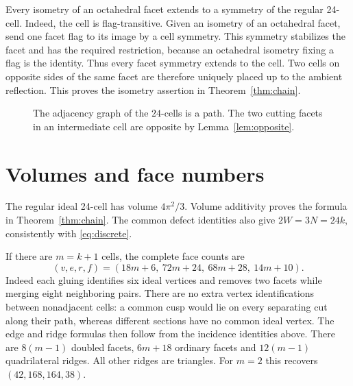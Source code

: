 \documentclass[11pt]{article}
\theoremstyle{remark}
\newcommand{\CELL}{\mathcal C}
\begin{document}
Every isometry of an octahedral facet extends to a symmetry of
the regular 24-cell. Indeed, the cell is flag-transitive. Given an isometry of an
octahedral facet, send one facet flag to its image by a cell
symmetry. This symmetry stabilizes the facet and has the required
restriction, because an octahedral isometry fixing a flag is the
identity. Thus every facet symmetry extends to the cell.
Two cells on opposite sides of the same facet are therefore
uniquely placed up to the ambient reflection. This proves the
isometry assertion in Theorem~\ref{thm:chain}.

\begin{figure}[htbp]
\centering
{}
\caption{The adjacency graph of the $24$-cells is a path.
The two cutting facets in an intermediate cell are opposite
by Lemma~\ref{lem:opposite}.}
\label{fig:chain}
\end{figure}

\section{Volumes and face numbers}

The regular ideal 24-cell has volume $4\pi^2/3$.
Volume additivity proves the formula in Theorem~\ref{thm:chain}. The common defect identities also give
$2W=3N=24k$, consistently with \eqref{eq:discrete}.

If there are $m=k+1$ cells, the complete face counts are
\[
 (v,e,r,f)=(18m+6,\ 72m+24,\ 68m+28,\ 14m+10).
\]
Indeed each gluing identifies six ideal vertices and removes two
facets while merging eight neighboring pairs. There are no extra
vertex identifications between nonadjacent cells: a common cusp
would lie on every separating cut along their path, whereas
different sections have no common ideal vertex. The edge and
ridge formulas then follow from the incidence identities above.
There are $8(m-1)$ doubled facets, $6m+18$ ordinary facets and
$12(m-1)$ quadrilateral ridges. All other ridges are triangles.
For $m=2$ this recovers $(42,168,164,38)$.
\end{document}
